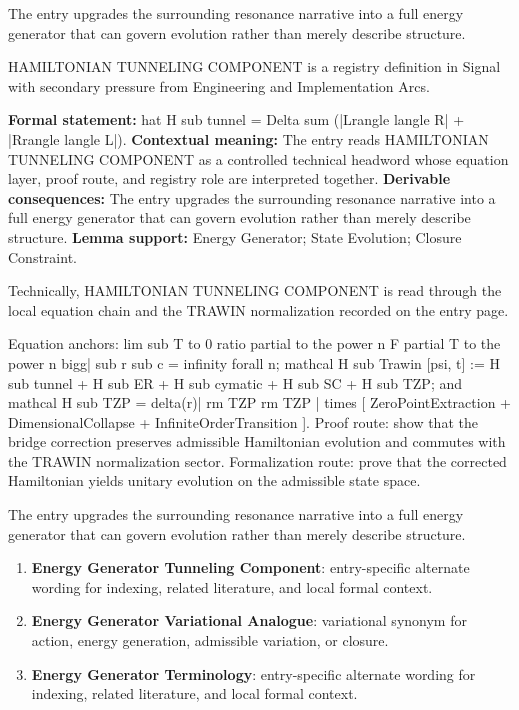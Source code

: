 The entry upgrades the surrounding resonance narrative into a full energy generator that can govern evolution rather than merely describe structure.
\clearpage


\begingroup\small
{}
HAMILTONIAN TUNNELING COMPONENT is a registry definition in Signal with secondary pressure from Engineering and Implementation Arcs.

\begingroup\footnotesize\setlength{\emergencystretch}{3em}\sloppy
\textbf{Formal statement:} hat H sub tunnel = Delta sum (|Lrangle langle R| + |Rrangle langle L|). \textbf{Contextual meaning:} The entry reads HAMILTONIAN TUNNELING COMPONENT as a controlled technical headword whose equation layer, proof route, and registry role are interpreted together. \textbf{Derivable consequences:} The entry upgrades the surrounding resonance narrative into a full energy generator that can govern evolution rather than merely describe structure. \textbf{Lemma support:} Energy Generator; State Evolution; Closure Constraint.\par
\endgroup

Technically, HAMILTONIAN TUNNELING COMPONENT is read through the local equation chain and the TRAWIN normalization recorded on the entry page.

Equation anchors: lim sub T to 0 ratio partial to the power n F partial T to the power n bigg| sub r sub c = infinity forall n; mathcal H sub Trawin [psi, t] := H sub tunnel + H sub ER + H sub cymatic + H sub SC + H sub TZP; and mathcal H sub TZP = delta(r)| rm TZP rm TZP | times [ ZeroPointExtraction + DimensionalCollapse + InfiniteOrderTransition ]. Proof route: show that the bridge correction preserves admissible Hamiltonian evolution and commutes with the TRAWIN normalization sector. Formalization route: prove that the corrected Hamiltonian yields unitary evolution on the admissible state space.

The entry upgrades the surrounding resonance narrative into a full energy generator that can govern evolution rather than merely describe structure.
\endgroup

\begin{enumerate}[leftmargin=1.6em,itemsep=6pt,topsep=4pt]
\item \textbf{Energy Generator Tunneling Component}: entry-specific alternate wording for indexing, related literature, and local formal context.
\item \textbf{Energy Generator Variational Analogue}: variational synonym for action, energy generation, admissible variation, or closure.
\item \textbf{Energy Generator Terminology}: entry-specific alternate wording for indexing, related literature, and local formal context.
\end{enumerate}

